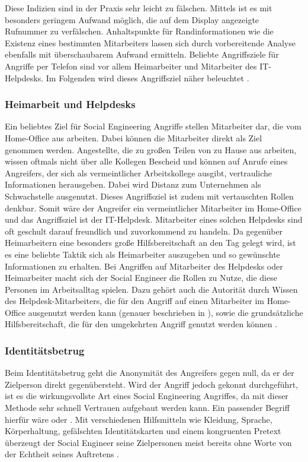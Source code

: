Diese Indizien sind in der Praxis sehr leicht zu fälschen. Mittels  ist es mit besonders geringem Aufwand möglich, die auf dem Display angezeigte Rufnummer zu verfälschen.
Anhaltspunkte für Randinformationen wie die Existenz eines bestimmten Mitarbeiters lassen sich durch vorbereitende Analyse ebenfalls mit überschaubarem Aufwand ermitteln.
Beliebte Angriffsziele für Angriffe per Telefon sind vor allem Heimarbeiter und Mitarbeiter des IT-Helpdesks.
Im Folgenden wird dieses Angriffsziel näher beleuchtet \citep{hadnagy}.


\subsubsection{Heimarbeit und Helpdesks}\label{sec:heimarbeitundhelpdesks}
Ein beliebtes Ziel für Social Engineering Angriffe stellen Mitarbeiter dar, die vom Home-Office aus
arbeiten.
Dabei können die Mitarbeiter direkt als Ziel genommen werden.
Angestellte, die zu großen Teilen von zu Hause aus arbeiten, wissen oftmals nicht über alle Kollegen Bescheid und können auf Anrufe eines Angreifers, der sich als vermeintlicher Arbeitskollege ausgibt, vertrauliche Informationen herausgeben.
Dabei wird Distanz zum Unternehmen als Schwachstelle ausgenutzt.
Dieses Angriffsziel ist zudem mit vertauschten Rollen denkbar.
Somit wäre der Angreifer ein vermeintlicher Mitarbeiter im Home-Office und das Angriffsziel ist der IT-Helpdesk.
Mitarbeiter eines solchen Helpdesks sind oft geschult darauf freundlich und zuvorkommend zu handeln.
Da gegenüber Heimarbeitern eine besonders große Hilfsbereitschaft an den Tag gelegt wird, ist es eine
beliebte Taktik sich als Heimarbeiter auszugeben und so gewünschte Informationen zu erhalten. 
Bei Angriffen auf Mitarbeiter des Helpdesks oder Heimarbeiter macht sich der Social Engineer die Rollen zu Nutze, die diese Personen im Arbeitsalltag spielen.
Dazu gehört auch die Autorität durch Wissen des Helpdesk-Mitarbeiters, die für den Angriff auf einen Mitarbeiter im Home-Office ausgenutzt werden kann (genauer beschrieben in ), sowie die grundsätzliche Hilfsbereitschaft, die für den umgekehrten Angriff genutzt werden können \citep{hacking-the-human}.


\subsubsection{Identitätsbetrug}\label{sec:identitätsbetrug}
Beim Identitätsbetrug geht die Anonymität des Angreifers gegen null, da er der Zielperson direkt gegenübersteht. Wird der Angriff jedoch gekonnt durchgeführt, ist es die wirkungsvollste Art eines Social Engineering Angriffes, da mit dieser Methode sehr schnell Vertrauen aufgebaut werden kann.
Ein passender Begriff hierfür wäre  oder .
Mit verschiedenen Hilfsmitteln wie Kleidung, Sprache, Körperhaltung, gefälschten Identitätskarten und einem kongruenten Pretext überzeugt der Social Engineer seine Zielpersonen meist bereits ohne Worte von der Echtheit seines Auftretens \citep{hadnagy}.

